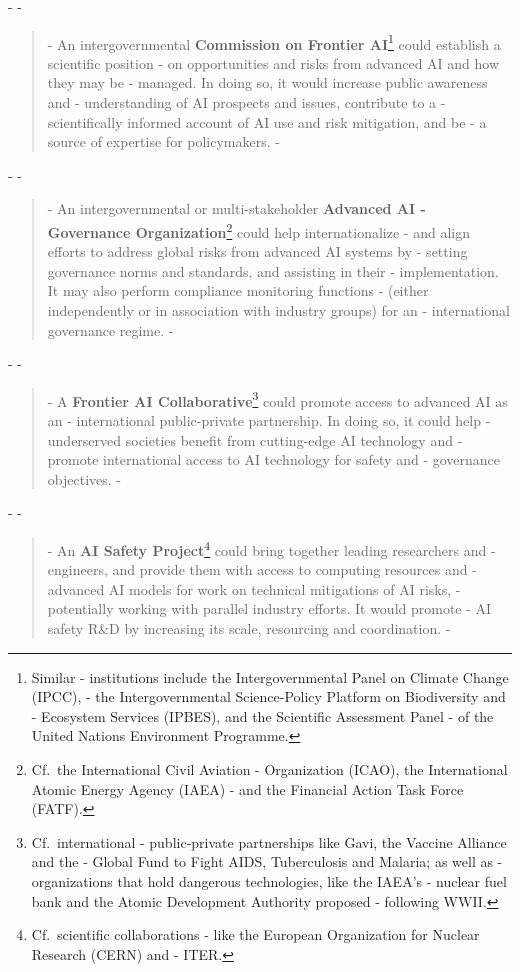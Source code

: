 \documentclass[12pt]{article}
\begin{document}
- 
- \begin{quote}
- An intergovernmental \textbf{Commission on Frontier AI}\footnote{Similar
- institutions include the Intergovernmental Panel on Climate Change (IPCC),
- the Intergovernmental Science-Policy Platform on Biodiversity and
- Ecosystem Services (IPBES), and the Scientific Assessment Panel
- of the United Nations Environment Programme.} could establish a scientific position
- on opportunities and risks from advanced AI and how they may be
- managed. In doing so, it would increase public awareness and
- understanding of AI prospects and issues, contribute to a
- scientifically informed account of AI use and risk mitigation, and be
- a source of expertise for policymakers.
- \end{quote}
- 
- \begin{quote}
- An intergovernmental or multi-stakeholder \textbf{Advanced AI
- Governance Organization}\footnote{Cf.\ the International Civil Aviation
- Organization (ICAO), the International Atomic Energy Agency (IAEA)
- and the Financial Action Task Force (FATF).} could help internationalize
- and align efforts to address global risks from advanced AI systems by
- setting governance norms and standards, and assisting in their
- implementation. It may also perform compliance monitoring functions
- (either independently or in association with industry groups) for an
- international governance regime.
- \end{quote}

- 
- \begin{quote}
- A \textbf{Frontier AI Collaborative}\footnote{Cf.\ international
- public-private partnerships like Gavi, the Vaccine Alliance and the
- Global Fund to Fight AIDS, Tuberculosis and Malaria; as well as
- organizations that hold dangerous technologies, like the IAEA's
- nuclear fuel bank and the Atomic Development Authority proposed
- following WWII.} could promote access to advanced AI as an
- international public-private partnership. In doing so, it could help
- underserved societies benefit from cutting-edge AI technology and
- promote international access to AI technology for safety and
- governance objectives.
- \end{quote}

- 
- \begin{quote}
- An \textbf{AI Safety Project}\footnote{Cf.\ scientific collaborations
- like the European Organization for Nuclear Research (CERN) and
- ITER.} could bring together leading researchers and
- engineers, and provide them with access to computing resources and
- advanced AI models for work on technical mitigations of AI risks,
- potentially working with parallel industry efforts. It would promote
- AI safety R\&D by increasing its scale, resourcing and coordination.
- \end{quote}
\end{document}

